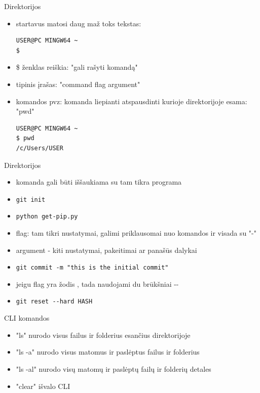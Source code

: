 \documentclass[11pt,xcolor=table]{beamer}
\begin{document}
\begin{frame}[fragile]{Direktorijos}
\begin{itemize}
\item startavus matosi daug maž toks tekstas:

\begin{lstlisting}
USER@PC MINGW64 ~
$ 
\end{lstlisting}

\item \$ ženklas reiškia: "gali rašyti komandą"
\item tipinis įrašas: "command flag argument"
\item komandos pvz: komanda liepianti atspausdinti kurioje direktorijoje esama: "pwd"

\begin{lstlisting}
USER@PC MINGW64 ~
$ pwd
/c/Users/USER
\end{lstlisting}

\end{itemize}
\end{frame}

\begin{frame}[fragile]{Direktorijos}
\begin{itemize}
\item komanda gali būti iššaukiama su tam tikra programa
\item \colorbox{listinggray}{\lstinline|git init|}
\item \colorbox{listinggray}{\lstinline|python get-pip.py|}
\item flag: tam tikri nustatymai, galimi priklausomai nuo komandos ir visada su "-"
\item argument - kiti nustatymai, pakeitimai ar panašūs dalykai
\item \colorbox{listinggray}{\lstinline|git commit -m "this is the initial commit"|}
\item jeigu flag yra žodis , tada naudojami du brūkšniai -\/- 
\item \colorbox{listinggray}{\lstinline|git reset --hard HASH|}

\end{itemize}
\end{frame}

\begin{frame}{CLI komandos}
\begin{itemize}
\item "ls" nurodo visus failus ir folderius esančius direktorijoje
\item "ls -a" nurodo visus matomus ir paslėptus failus ir folderius
\item "ls -al" nurodo visų matomų ir paslėptų failų ir folderių detales
\item "clear" išvalo CLI
\end{itemize}
\end{frame}
\end{document}
